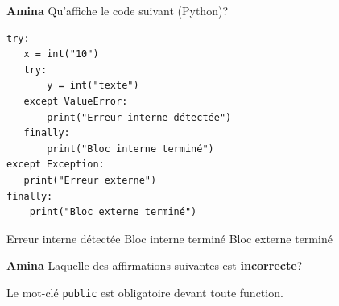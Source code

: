 \begin{Exercice}[5 minutes]\textbf{Amina}
Qu'affiche le code suivant (Python)?
\begin{lstlisting}[style=pythonstyle]
try:
   x = int("10")
   try:
       y = int("texte")
   except ValueError:
       print("Erreur interne détectée")
   finally:
       print("Bloc interne terminé")
except Exception:
   print("Erreur externe")
finally:
    print("Bloc externe terminé")
\end{lstlisting}


\begin{solution}
Erreur interne détectée \newline 
Bloc interne terminé \newline 
Bloc externe terminé
\end{solution}

\end{Exercice}

\begin{Exercice}[5 minutes]\textbf{Amina}
Laquelle des affirmations suivantes est \textbf{incorrecte}?


\begin{solution}
Le mot-clé \texttt{public} est obligatoire devant toute function.
\end{solution}

\end{Exercice}


